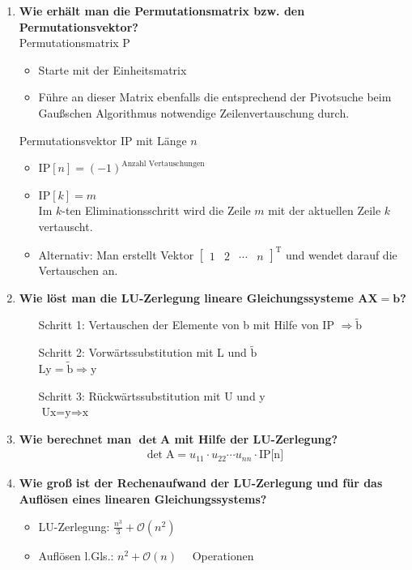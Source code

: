 \begin{enumerate}
		\item \textbf{Wie erhält man die Permutationsmatrix bzw. den Permutationsvektor?} \\
			Permutationsmatrix P
			\begin{itemize}
				\item Starte mit der Einheitsmatrix
				\item Führe an dieser Matrix ebenfalls die entsprechend der Pivotsuche beim Gaußschen Algorithmus notwendige Zeilenvertauschung durch.
			\end{itemize}
			Permutationsvektor IP mit Länge \(n\)
			\begin{itemize}
				\item \(\text{IP}[n]=(-1)^{\text{Anzahl Vertauschungen}}\)
				\item \(\text{IP}[k]=m\) \\
					Im \(k\)-ten Eliminationsschritt wird die Zeile \(m\) mit der aktuellen Zeile \(k\) vertauscht.
				\item Alternativ: Man erstellt Vektor \(\begin{bmatrix}
				1 & 2 & \cdots & n
				\end{bmatrix}^\text{T}\) und wendet darauf die Vertauschen an.
			\end{itemize}
		
		\item \textbf{Wie löst man die LU-Zerlegung lineare Gleichungssysteme \(\mathbf{AX=b}\)?}
			\begin{enumerate}
				\item[Schritt 1:] Vertauschen der Elemente von b mit Hilfe von IP \(\Rightarrow\tilde{\text{b}}\)
				\item[Schritt 2:] Vorwärtssubstitution mit L und \(\tilde{\text{b}}\) \\
				\(\text{Ly}=\tilde{\text{b}}\Rightarrow\text{y}\)
				\item[Schritt 3:] Rückwärtssubstitution mit U und y \\
				\(\text{Ux=y}\Rightarrow \text{x}\)
			\end{enumerate}
		
		\item \textbf{Wie berechnet man \(\mathbf{\det A}\) mit Hilfe der LU-Zerlegung?}
			\begin{align*}
				\det{\text{A}}=u_{11}\cdot u_{22}\cdots u_{nn}\cdot\text{IP[n]}
			\end{align*}
		
		\item \textbf{Wie groß ist der Rechenaufwand der LU-Zerlegung und für das Auflösen eines linearen Gleichungssystems?}
			\begin{itemize}
				\item LU-Zerlegung: \(\frac{n^3}{3}+\mathcal{O}(n^2) \quad\) 
				\item Auflösen l.Gls.: \(n^2+\mathcal{O}(n) \quad\) Operationen
			\end{itemize}
		

\end{enumerate}

